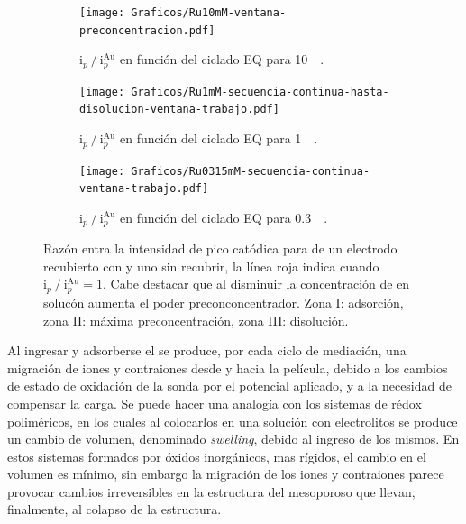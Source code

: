 		 	\begin{figure}[th]
	 	   	    \begin{subfigure}[t]{0.495\textwidth}
		        	\texttt{[image: Graficos/Ru10mM-ventana-preconcentracion.pdf]}
		       		\caption{$\text{i}_p\mathbin{/}\text{i}_p^{\text{Au}}$ en función del ciclado EQ para \ru\space \SI{10}{\milli\Molar}.}
		         	\label{fig:Ventana_Ru10mM}
		     		\end{subfigure}
	     		\begin{subfigure}[t]{0.495\textwidth}
		        	\texttt{[image: Graficos/Ru1mM-secuencia-continua-hasta-disolucion-ventana-trabajo.pdf]}
		       		\caption{$\text{i}_p\mathbin{/}\text{i}_p^{\text{Au}}$ en función del ciclado EQ para \ru\space \SI{1}{\milli\Molar}.}
		         	\label{fig:Ventana_Ru1mM}
		     		\end{subfigure}
	     		\begin{center}
	     		\begin{subfigure}[t]{0.495\textwidth}
		        	\texttt{[image: Graficos/Ru0315mM-secuencia-continua-ventana-trabajo.pdf]}
		       		\caption{$\text{i}_p\mathbin{/}\text{i}_p^{\text{Au}}$ en función del ciclado EQ para \ru\space \SI{0.3}{\milli\Molar}.}
		         	\label{fig:Ventana_Ru0315mM}
		     		\end{subfigure}
		     		\end{center}
	 	   	   	\caption[Intensidad en función del ciclado EQ para \pdmF]{Razón entra la intensidad de pico catódica para \ru\space de un electrodo recubierto con \pdm\space y uno sin recubrir, la línea roja indica cuando $\text{i}_p\mathbin{/}\text{i}_p^{\text{Au}} = 1$. Cabe destacar que al disminuir la concentración de \ru\space en solucón aumenta el poder preconconcentrador. Zona I: adsorción, zona II: máxima preconcentración, zona III: disolución.}
	     		\label{fig:ventanas}
	     	  \end{figure}

	    \pagebreak

		Al ingresar y adsorberse el \ru\space se produce, por cada ciclo de mediación, una migración de iones y contraiones desde y hacia la película, debido a los cambios de estado de oxidación de la sonda por el potencial aplicado, y a la necesidad de compensar la carga.  Se puede hacer una analogía con los sistemas de rédox poliméricos, en los cuales al colocarlos en una solución con electrolitos se produce un cambio de volumen, denominado \textit{swelling}, debido al ingreso de los mismos\cite{Ybarra2005}. En estos sistemas formados por óxidos inorgánicos, mas rígidos, el cambio en el volumen es mínimo,\cite{Malfatti2009} sin embargo la migración de los iones y contraiones parece provocar cambios irreversibles en la estructura del mesoporoso que llevan, finalmente, al colapso de la estructura.
		
